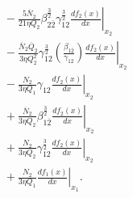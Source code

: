 \documentclass[final,3p,times,twocolumn]{elsarticle}
\begin{document}
\begin{equation}
\begin{split}
&\quad
- \left.
\frac{5 \overline{N}_{2}}{21 \eta Q_2}
\beta_{2\overline{2}}^{\frac{3}{2}}
\gamma_{12}^{\frac{3}{2}}
\frac{d f_2(x)}{dx}
\right|_{x_2} \\
&\quad
- \left.
\frac{\overline{N}_{2} \overline{Q}_{2}}{3 \eta Q_2^{2}}
\gamma_{12}^{\frac{3}{2}}
\left(\frac{\beta_{1\overline{2}}}{\gamma_{12}}\right)
\frac{d f_2(x)}{dx}
\right|_{x_2} \\
&\quad
- \left.
\frac{N_2}{3 \eta Q_1}
\gamma_{12}
\frac{d f_2(x)}{dx}
\right|_{x_2} \\
&\quad
+ \left.
\frac{\overline{N}_{2}}{3 \eta Q_2}
\beta_{1\overline{2}}^{\frac{3}{2}}
\frac{d f_2(x)}{dx}
\right|_{x_2} \\
&\quad
+ \left.
\frac{N_2}{3 \eta Q_2}
\gamma_{12}^{\frac{3}{2}}
\frac{d f_2(x)}{dx}
\right|_{x_2} \\
&\quad
+ \left.
\frac{N_2}{3 \eta Q_1}
\frac{d f_1(x)}{dx}
\right|_{x_1}.
\end{split}
\label{eqn:k12_caseI}
\end{equation}
\end{document}
